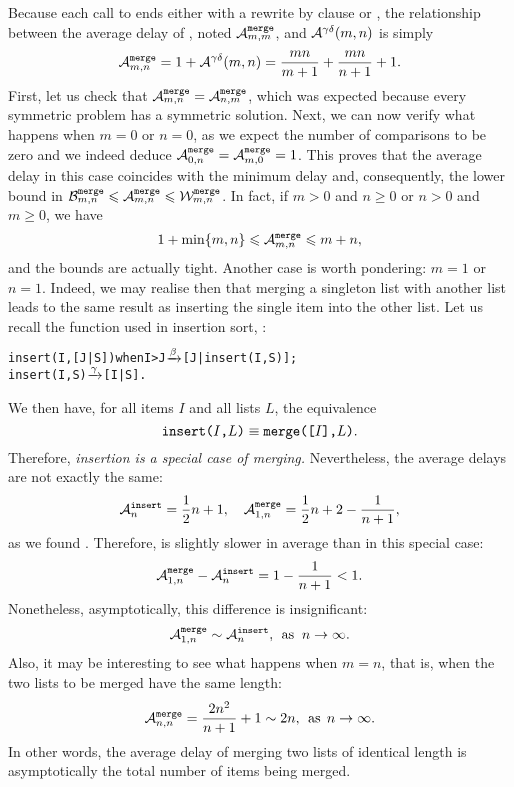 

\noindent Because each call to  ends either with a
rewrite by clause \clause{\alpha} or \clause{\beta}, the relationship
between the average delay of , noted
\(\ave{merge}{m,m}\), and \(\Aideal^{\gamma\delta}(m,n)\) is simply
\begin{equation}
\ave{merge}{m,n} = 1 + \Aideal^{\gamma\delta}(m,n)
                 = \frac{mn}{m+1} + \frac{mn}{n+1} + 1.
\label{eq:ave_merge}
\end{equation}
First, let us check that \(\ave{merge}{m,n} = \ave{merge}{n,m}\),
which was expected because every symmetric problem has a symmetric
solution. Next, we can now verify what happens when \(m=0\) or
\(n=0\), as we expect the number of comparisons to be zero and we
indeed deduce \(\ave{merge}{0,n} = \ave{merge}{m,0} = 1\). This proves
that the average delay in this case coincides with the minimum delay
and, consequently, the lower bound in \(\best{merge}{m,n} \leqslant
\ave{merge}{m,n} \leqslant \worst{merge}{m,n}\). In fact, if \(m > 0\)
and \(n \geqslant 0\) or \(n > 0\) and \(m \geqslant 0\), we have
\[
1 + \min\{m,n\} \leqslant \ave{merge}{m,n} \leqslant m + n,
\]
and the bounds are actually tight. Another case is worth pondering:
\(m=1\) or \(n=1\). Indeed, we may realise then that merging a
singleton list with another list leads to the same result as inserting
the single item into the other list. Let us recall the
 function used in insertion sort,
:
\begin{alltt}
insert(I,[J|S]) when I > J \(\smashedrightarrow{\beta}\) [J|insert(I,S)];
insert(I,    S)            \(\smashedrightarrow{\gamma}\) [I|S].
\end{alltt}
We then have, for all items \(I\) and all lists \(L\), the equivalence
\[
\erlcode{insert(\(I\),\(L\))} \mathrel{\equiv}
\erlcode{merge([\(I\)],\(L\))}.
\]
Therefore, \emph{insertion is a special case of merging.}
Nevertheless, the average delays are not exactly the same:
\[
\ave{insert}{n} = \frac{1}{2}{n} + 1,\quad
\ave{merge}{1,n} = \frac{1}{2}{n} + 2 - \frac{1}{n+1},
\]
as we found . Therefore,  is
slightly slower in average than  in this special
case:
\[
\ave{merge}{1,n} - \ave{insert}{n} = 1 - \frac{1}{n+1} < 1.
\]
Nonetheless, asymptotically, this difference is insignificant:
\[
\ave{merge}{1,n} \mathrel{\sim} \ave{insert}{n},
\,\; \text{as} \;\; n \rightarrow \infty.
\]
Also, it may be interesting to see what happens when \(m=n\), that is,
when the two lists to be merged have the same length:
\begin{equation}
\ave{merge}{n,n}
  = \frac{2n^2}{n+1} + 1
  \mathrel{\sim} 2n,\,\; \text{as} \,\; n \rightarrow \infty.
\label{eq:ave_merge_n_n}
\end{equation}
In other words, the average delay of merging two lists of identical
length is asymptotically the total number of items being merged.

